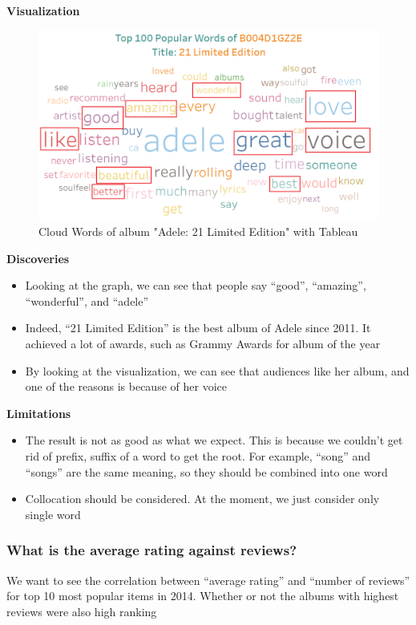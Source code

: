 \documentclass[a4paper,11pt]{article}
\begin{document}
			
			\textbf{Visualization}		
			\begin{figure}[H]
				\includegraphics[width=1\textwidth, center]{pic9}
				\caption{Cloud Words of album "Adele: 21 Limited Edition" with Tableau}
			\end{figure}	
			
			
			\textbf{Discoveries}
			\begin{itemize}
				\item Looking at the graph, we can see that people say “good”, “amazing”, “wonderful”, and “adele”
				\item Indeed, “21 Limited Edition” is the best album of Adele since 2011. It achieved a lot of awards, such as Grammy Awards for album of the year
				\item By looking at the visualization, we can see that audiences like her album, and one of the reasons is because of her voice
			\end{itemize}
		
			
			\textbf{Limitations}
			\begin{itemize}
				\item The result is not as good as what we expect. This is because we couldn’t get rid of prefix, suffix of a word to get the root. For example, “song” and “songs” are the same meaning, so they should be combined into one word
				\item Collocation should be considered. At the moment, we just consider only single word
			\end{itemize}						
			
		\subsubsection{What is the average rating against reviews?}
		We want to see the correlation between “average rating” and “number of reviews” for top 10 most popular items in 2014. Whether or not the albums with highest reviews were also high ranking
		
\end{document}
